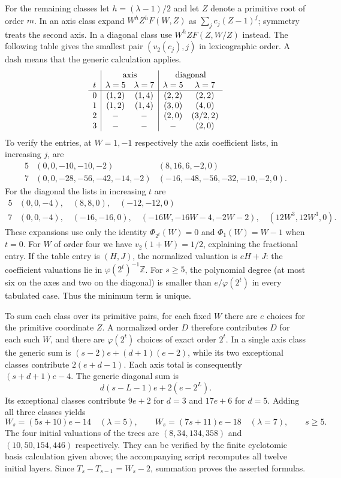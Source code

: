 For the remaining classes let $h=(\lambda-1)/2$ and let $Z$ denote a primitive root of order $m$. In an axis class expand $W^hZ^hF(W,Z)$ as $\sum_j c_j(Z-1)^j$; symmetry treats the second axis. In a diagonal class use $W^h ZF(Z,W/Z)$ instead. The following table gives the smallest pair $(v_2(c_j),j)$ in lexicographic order. A dash means that the generic calculation applies.
\[
\begin{array}{c|cc|cc}
&\multicolumn{2}{c|}{\text{axis}}&\multicolumn{2}{c}{\text{diagonal}}\\
 t&\lambda=5&\lambda=7&\lambda=5&\lambda=7\\\hline
 0&(1,2)&(1,4)&(2,2)&(2,2)\\
 1&(1,2)&(1,4)&(3,0)&(4,0)\\
 2&-&-&(2,0)&(3/2,2)\\
 3&-&-&-&(2,0)
\end{array}
\]
To verify the entries, at $W=1,-1$ respectively the axis coefficient lists, in increasing $j$, are
\[
\begin{array}{c|ll}
5&(0,0,-10,-10,-2)&(8,16,6,-2,0)\\
7&(0,0,-28,-56,-42,-14,-2)&(-16,-48,-56,-32,-10,-2,0).
\end{array}
\]
For the diagonal the lists in increasing $t$ are
\[
\begin{array}{c|l}
5&(0,0,-4),\quad(8,8,0),\quad(-12,-12,0)\\
7&(0,0,-4),\quad(-16,-16,0),\quad
 (-16W,-16W-4,-2W-2),\quad(12W^3,12W^3,0).
\end{array}
\]
These expansions use only the identity $\Phi_{2^t}(W)=0$ and $\Phi_1(W)=W-1$ when $t=0$. For $W$ of order four we have $v_2(1+W)=1/2$, explaining the fractional entry. If the table entry is $(H,J)$, the normalized valuation is $eH+J$: the coefficient valuations lie in $\varphi(2^t)^{-1}\mathbb Z$. For $s\ge5$, the polynomial degree (at most six on the axes and two on the diagonal) is smaller than $e/\varphi(2^t)$ in every tabulated case. Thus the minimum term is unique.

To sum each class over its primitive pairs, for each fixed $W$ there are $e$ choices for the primitive coordinate $Z$. A normalized order $D$ therefore contributes $D$ for each such $W$, and there are $\varphi(2^t)$ choices of exact order $2^t$. In a single axis class the generic sum is $(s-2)e+(d+1)(e-2)$, while its two exceptional classes contribute $2(e+d-1)$. Each axis total is consequently $(s+d+1)e-4$. The generic diagonal sum is
\[
 d(s-L-1)e+2(e-2^L).
\]
Its exceptional classes contribute $9e+2$ for $d=3$ and $17e+6$ for $d=5$. Adding all three classes yields
\[
 W_s=(5s+10)e-14\quad (\lambda=5),\qquad
 W_s=(7s+11)e-18\quad (\lambda=7),\qquad s\ge5.
\]
The four initial valuations of the trees are $(8,34,134,358)$ and $(10,50,154,446)$ respectively. They can be verified by the finite cyclotomic basis calculation given above; the accompanying script recomputes all twelve initial layers. Since $T_s-T_{s-1}=W_s-2$, summation proves the asserted formulas.
